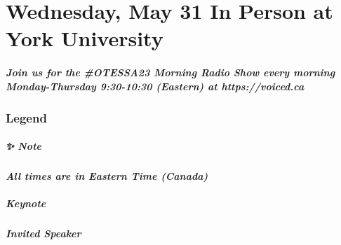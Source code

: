 \documentclass[
]{book}
\begin{document}
\hypertarget{wednesday-may-31-in-person-at-york-university}{%
\chapter{Wednesday, May 31 \textbar{} In Person at York University}\label{wednesday-may-31-in-person-at-york-university}}

\begin{protip}
\hypertarget{join-us-for-the-otessa23-morning-radio-show-every-morning-monday-thursday-930-1030-eastern-at-httpsvoiced.ca}{%
\paragraph{Join us for the \#OTESSA23 Morning Radio Show every morning
Monday-Thursday 9:30-10:30 (Eastern) at
https://voiced.ca}\label{join-us-for-the-otessa23-morning-radio-show-every-morning-monday-thursday-930-1030-eastern-at-httpsvoiced.ca}}
\end{protip}

\hypertarget{legend-3}{%
\subsection*{Legend}\label{legend-3}}

\begin{protip}
\hypertarget{note}{%
\paragraph*{✨ Note}\label{note}}

\textbf{\emph{All times are in Eastern Time (Canada)}}
\end{protip}

\begin{keynote}
\hypertarget{keynote}{%
\paragraph{Keynote}\label{keynote}}
\end{keynote}

\begin{speaker}
\hypertarget{invited-speaker}{%
\paragraph{Invited Speaker}\label{invited-speaker}}
\end{speaker}
\end{document}
